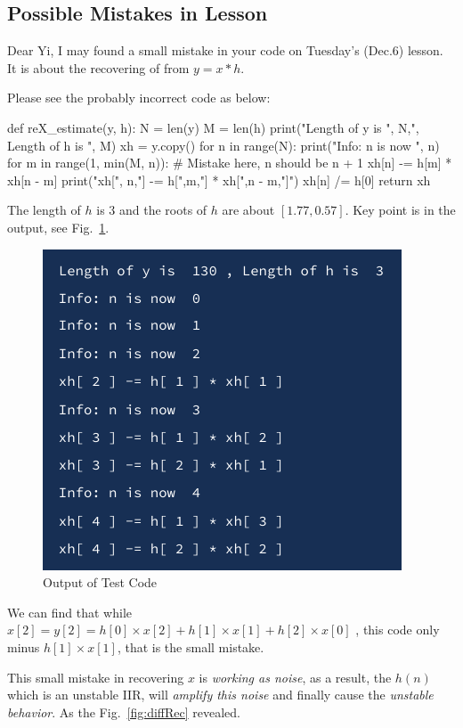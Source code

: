 \documentclass{article}
\begin{document}
\begin{appendices}
\section{Possible Mistakes in Lesson}
Dear Yi, I may found a small mistake in your code on Tuesday's (Dec.6) lesson. It is about the recovering of
from $y = x * h$. 

Please see the probably incorrect code as below:
\begin{python}
def reX_estimate(y, h):
	N = len(y)
	M = len(h)
	print("Length of y is ", N,", Length of h is ", M)
	xh = y.copy()
	for n in range(N):
		print("Info: n is now ", n)
		for m in range(1, min(M, n)): # Mistake here, n should be n + 1
			xh[n] -= h[m] * xh[n - m]
			print("xh[", n,"] -= h[",m,"] * xh[",n - m,"]")
		xh[n] /= h[0]
	return xh
\end{python}

The length of $h$ is $3$ and the roots of $h$ are about $[1.77, 0.57]$. Key point is in the output, see Fig.~\ref{fig:output}.

\begin{figure}[!h]
	\centering
	\includegraphics[width=2 in]{../pic/comparisonOutput.png}
	\caption{Output of Test Code}
	\label{fig:output}
\end{figure}

We can find that while $\hat{x}[2] = y[2] = h[0] \times x[2] + h[1]\times x[1] + h[2] \times x[0]$ , this code only minus $h[1] \times x[1]$, that is the small mistake.

This small mistake in recovering $x$ is \emph{working as noise}, as a result, the $h(n)$ which is an unstable IIR, will \emph{amplify this noise} and finally cause the \emph{unstable behavior}. As the Fig.~\ref{fig:diffRec} revealed.


\end{appendices}
\end{document}
